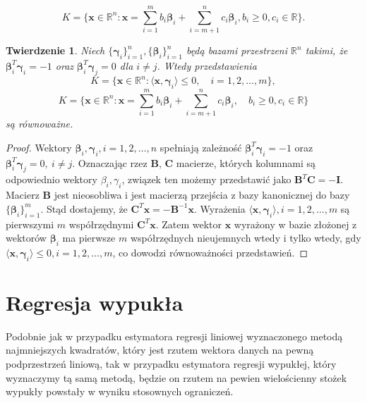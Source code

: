 \documentclass[12pt]{mwart}
\newtheorem{tw}{Twierdzenie}
\begin{document}
\begin{displaymath}
K=\{\textbf{x}\in \mathbb{R}^n\colon \textbf{x}=\sum_{i=1}^m{b_i\pmb{\beta}_i}+\sum_{i=m+1}^n{c_i\pmb{\beta}_i}, b_i\geq 0, c_i\in \mathbb{R}\}.
\end{displaymath}
\begin{tw}
Niech $\{\pmb{\gamma}_i\}_{i=1}^n,\{\pmb{\beta}_i\}_{i=1}^n$ będą bazami przestrzeni $\mathbb{R}^n$ takimi, że $\pmb{\beta}_i^T\pmb{\gamma}_i=-1$ oraz $\pmb{\beta}_i^T\pmb{\gamma}_j=0$ dla $i\neq j$. Wtedy przedstawienia
\begin{displaymath}
K=\{\textbf{x}\in \mathbb{R}^n\colon \langle \textbf{x}, \pmb{\gamma}_i\rangle \leq 0, \quad i=1,2,\dots,m\},
\end{displaymath}
\begin{displaymath}
K=\{\textbf{x}\in \mathbb{R}^n\colon \textbf{x}=\sum_{i=1}^m{b_i\pmb{\beta}_i}+\sum_{i=m+1}^n{c_i\pmb{\beta}_i},\quad b_i\geq 0, c_i\in \mathbb{R}\}
\end{displaymath}
są równoważne.
\end{tw}
\begin{proof}
Wektory $\pmb{\beta}_i, \pmb{\gamma}_i,i=1,2,\dots,n$ spełniają zależność $\pmb{\beta}_i^T\pmb{\gamma}_i=-1$ oraz $\pmb{\beta}_i^T\pmb{\gamma}_j=0,\ i\neq j$. Oznaczając rzez $\mathbf{B}$, $\mathbf{C}$ macierze, których kolumnami są odpowiednio wektory $\beta_i,\gamma_i$, związek ten możemy przedstawić jako $\mathbf{B}^T\mathbf{C}=-\mathbf{I}$. Macierz $\pmb{B}$ jest nieosobliwa i jest macierzą przejścia z bazy kanonicznej do bazy $\{\pmb{\beta}_i\}_{i=1}^m$. Stąd dostajemy, że $\mathbf{C}^T\textbf{x}=-\mathbf{B}^{-1}\textbf{x}$.  Wyrażenia $\langle \textbf{x}, \pmb{\gamma}_i\rangle ,i=1,2,\dots,m$ są pierwszymi $m$ współrzędnymi $\mathbf{C}^T\textbf{x}$. Zatem wektor $\textbf{x}$ wyrażony w bazie złożonej z wektorów $\pmb{\beta}_i$ ma pierwsze $m$ współrzędnych nieujemnych wtedy i tylko wtedy, gdy $ \langle \textbf{x}, \pmb{\gamma}_i\rangle \leq 0, i=1,2,\dots,m$, co dowodzi równoważności przedstawień.
\end{proof}

\section{Regresja wypukła}
Podobnie jak w przypadku estymatora regresji liniowej wyznaczonego metodą najmniejszych kwadratów, który jest rzutem wektora danych na pewną podprzestrzeń liniową, tak w przypadku estymatora regresji wypukłej, który wyznaczymy tą samą metodą, będzie on rzutem na pewien wielościenny stożek wypukły powstały w wyniku stosownych ograniczeń.
\end{document}
